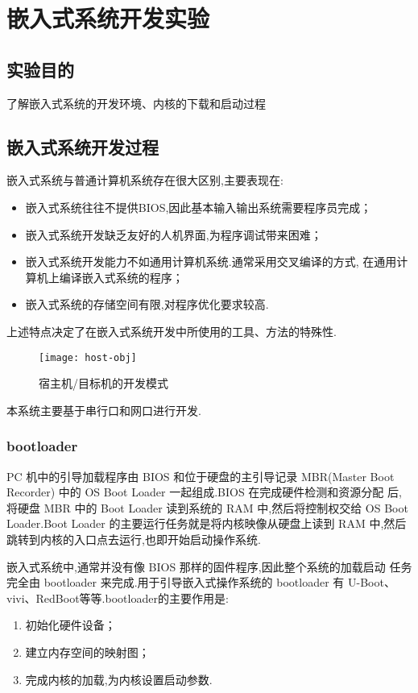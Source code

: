 \chapter{嵌入式系统开发实验}\label{ch-env}

\section{实验目的}
    了解嵌入式系统的开发环境、内核的下载和启动过程

\section{嵌入式系统开发过程}
    嵌入式系统与普通计算机系统存在很大区别,主要表现在:
\begin{itemize}\itemsep=-3pt
  \item 嵌入式系统往往不提供BIOS,因此基本输入输出系统需要程序员完成；
  \item 嵌入式系统开发缺乏友好的人机界面,为程序调试带来困难；
  \item 嵌入式系统开发能力不如通用计算机系统.通常采用交叉编译的方式,
        在通用计算机上编译嵌入式系统的程序；
  \item 嵌入式系统的存储空间有限,对程序优化要求较高.
\end{itemize}
    上述特点决定了在嵌入式系统开发中所使用的工具、方法的特殊性.

\begin{figure}[!h]
\centering
  \texttt{[image: host-obj]}
\caption{宿主机/目标机的开发模式}
\end{figure}

    本系统主要基于串行口和网口进行开发.

\subsection{bootloader}
	PC 机中的引导加载程序由 BIOS 和位于硬盘的主引导记录 MBR(Master Boot
Recorder) 中的 OS Boot Loader 一起组成.BIOS 在完成硬件检测和资源分配
后,将硬盘 MBR 中的 Boot Loader 读到系统的 RAM 中,然后将控制权交给
OS Boot Loader.Boot Loader 的主要运行任务就是将内核映像从硬盘上读到
RAM 中,然后跳转到内核的入口点去运行,也即开始启动操作系统.

	嵌入式系统中,通常并没有像 BIOS 那样的固件程序,因此整个系统的加载启动
任务完全由 bootloader 来完成.用于引导嵌入式操作系统的 bootloader 有
U-Boot、vivi、RedBoot等等.bootloader的主要作用是:
\begin{enumerate}\itemsep=-3pt
  \item 初始化硬件设备；
  \item 建立内存空间的映射图；
  \item 完成内核的加载,为内核设置启动参数.
\end{enumerate}

